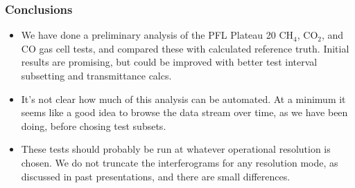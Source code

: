 \documentclass[10pt]{beamer}
\begin{document}
\begin{frame}
\frametitle{Conclusions}
\begin{itemize}

  \item We have done a preliminary analysis of the PFL Plateau 20
    CH$_4$, CO$_2$, and CO gas cell tests, and compared these with
    calculated reference truth.  Initial results are promising, but
    could be improved with better test interval subsetting and
    transmittance calcs.

  \item It's not clear how much of this analysis can be automated.
    At a minimum it seems like a good idea to browse the data stream
    over time, as we have been doing, before chosing test subsets.

  \item These tests should probably be run at whatever operational
    resolution is chosen.  We do not truncate the interferograms for
    any resolution mode, as discussed in past presentations, and
    there are small differences.

\end{itemize}
\end{frame}
\end{document}
